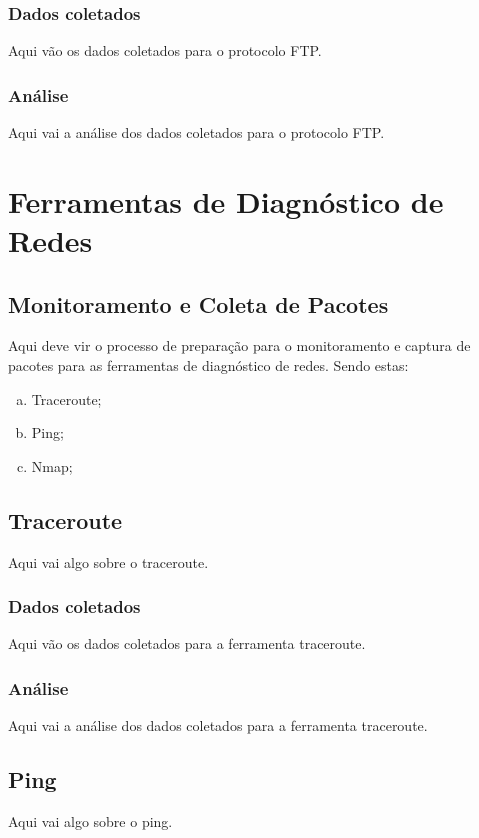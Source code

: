 \documentclass[a4paper]{report} %
\begin{document}
\subsection{Dados coletados}
\label{sub_ftp_dados}
Aqui vão os dados coletados para o protocolo FTP.

\subsection{Análise}
\label{sub_ftp_analise}
Aqui vai a análise dos dados coletados para o protocolo FTP.

\chapter{Ferramentas de Diagnóstico de Redes}
\label{chap_segundo}

\section{Monitoramento e Coleta de Pacotes}
\label{sec_segundo_monitoramento}

Aqui deve vir o processo de preparação para o monitoramento e captura de pacotes para as ferramentas de
diagnóstico de redes. Sendo estas:
\begin{enumerate}[a)]
 \item Traceroute;
 \item Ping;
 \item Nmap;
\end{enumerate}

\section{Traceroute}
\label{sec_traceroute}
Aqui vai algo sobre o traceroute.
\subsection{Dados coletados}
\label{sub_traceroute_dados}
Aqui vão os dados coletados para a ferramenta traceroute.

\subsection{Análise}
\label{sub_traceroute_analise}
Aqui vai a análise dos dados coletados para a ferramenta traceroute.

\section{Ping}
\label{sec_ping}
Aqui vai algo sobre o ping.
\end{document}
